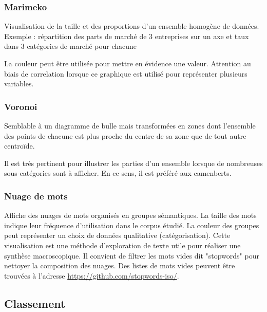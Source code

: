 \documentclass[a4paper,12pt]{article}
\begin{document}
\begin{multicols}{2}
\subsubsection*{Marimeko}
\label{sec:org93f4c06}
Visualisation de la taille et des proportions d'un ensemble homogène de données. \autocite{alansmithLexiqueVisuel}
Exemple : répartition des parts de marché de 3 entreprises sur un axe et taux dans 3 catégories de marché pour chacune

La couleur peut être utilisée pour mettre en évidence une valeur. \autocite{jonathanschwabishComparingCategories2021} Attention au biais de correlation lorsque ce graphique est utilisé pour représenter plusieurs variables. \autocite{jonathanschwabishComparingCategories2021}
\subsubsection*{Voronoi}
\label{sec:orgb294d6f}
Semblable à un diagramme de bulle mais transformées en zones dont l'ensemble des points de chacune est plus proche du centre de sa zone que de tout autre centroïde. \autocite{alansmithLexiqueVisuel}

Il est très pertinent pour illustrer les parties d'un ensemble lorsque de nombreuses sous-catégories sont à afficher. \autocite{jonathanschwabishParttowhole2021} En ce sens, il est préféré aux camenberts.
\subsubsection*{Nuage de mots}
\label{sec:org6b3607d}
Affiche des nuages de mots organisés en groupes sémantiques. La taille des mots indique leur fréquence d'utilisation dans le corpus étudié. La couleur des groupes peut représenter un choix de données qualitative (catégorisation). \autocite{sosulskiGraphics2019} Cette visualisation est une méthode d'exploration de texte utile pour réaliser une synthèse macroscopique.
Il convient de filtrer les mots vides dit "stopwords" pour nettoyer la composition des nuages. \autocite{jonathanschwabishQualitative2021} Des listes de mots vides peuvent être trouvées à l'adresse \url{https://github.com/stopwords-iso/}.
\subsection*{Classement}
\label{sec:org24408b5}


\end{multicols}
\end{document}
